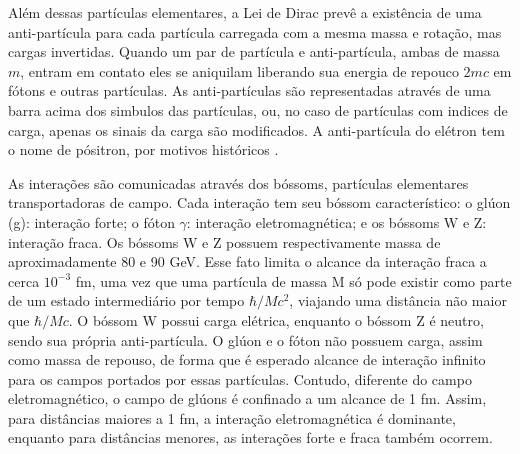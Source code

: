 
Além dessas partículas elementares, a Lei de Dirac prevê a
existência de uma anti-partícula para cada partícula carregada
com a mesma massa e rotação, mas cargas invertidas. 
Quando um par de partícula e anti-partícula, ambas de massa $m$, entram em contato
eles se aniquilam liberando sua energia de repouco $2mc$ em fótons e outras
partículas. As anti-partículas são representadas através de uma barra acima dos simbulos
das partículas, ou, no caso de partículas com indices de carga, 
apenas os sinais da carga são modificados. A anti-partícula do elétron tem o nome de pósitron, por motivos
históricos \cite{Intro_Standard,Intro_Nuclear}. 

As interações são comunicadas através dos bóssoms, partículas elementares
transportadoras de campo. Cada interação tem seu
bóssom característico: o glúon (g): interação forte; o fóton $\gamma$: interação 
eletromagnética; e os bóssoms W e Z: interação fraca.  
Os bóssoms W e Z possuem respectivamente massa de aproximadamente
80 e 90 GeV. Esse fato limita o alcance da interação fraca a cerca $10^{-3}$ fm,
uma vez que uma partícula de massa M só pode existir como parte de um estado
intermediário por tempo $\hbar/Mc^2$, viajando uma distância não maior que
$\hbar/Mc$. O bóssom W possui carga elétrica, enquanto o bóssom Z é neutro, sendo sua própria anti-partícula.
O glúon e o fóton não possuem carga, assim como massa de repouso, de forma que é esperado alcance de
interação infinito para os campos portados por essas partículas. 
Contudo, diferente do campo eletromagnético, o campo de
glúons é confinado a um alcance de 1 fm. 
Assim, para distâncias maiores a 1 fm, a interação eletromagnética é dominante,
enquanto para distâncias menores, as interações forte e fraca também ocorrem.

